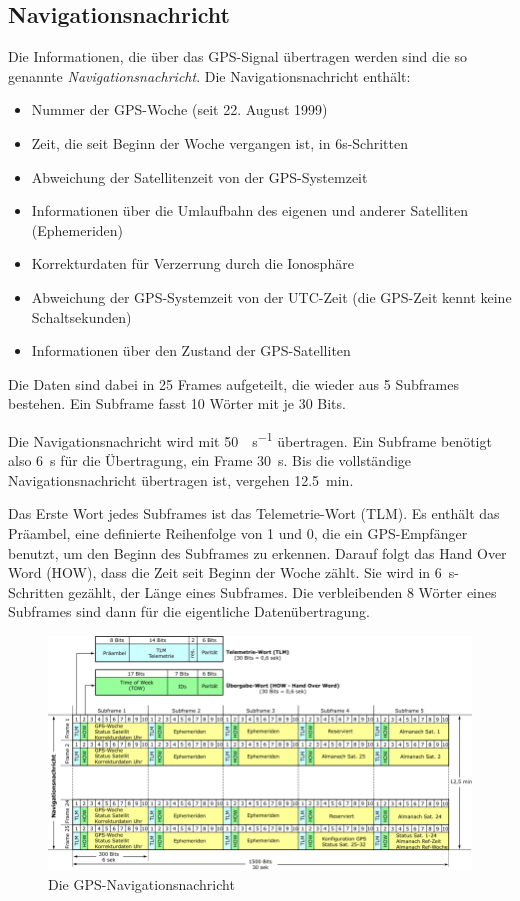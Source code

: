 \documentclass[12pt,a4paper]{scrartcl}
\begin{document}
\subsection{Navigationsnachricht}
Die Informationen, die über das GPS-Signal übertragen werden sind die so genannte \emph{Navigationsnachricht}. Die Navigationsnachricht enthält:
\begin{itemize}
\item Nummer der GPS-Woche (seit 22. August 1999)
\item Zeit, die seit Beginn der Woche vergangen ist, in 6s-Schritten
\item Abweichung der Satellitenzeit von der GPS-Systemzeit
\item Informationen über die Umlaufbahn des eigenen und anderer Satelliten (Ephemeriden)
\item Korrekturdaten für Verzerrung durch die Ionosphäre
\item Abweichung der GPS-Systemzeit von der UTC-Zeit (die GPS-Zeit kennt keine Schaltsekunden)
\item Informationen über den Zustand der GPS-Satelliten
\end{itemize}
\cite{infotip_gps}

Die Daten sind dabei in 25 Frames aufgeteilt, die wieder aus 5 Subframes bestehen. Ein Subframe fasst 10 Wörter mit je 30 Bits.

Die Navigationsnachricht wird mit \SI{50}{\bit\per\second} übertragen.
Ein Subframe benötigt also \SI{6}{\second} für die Übertragung, ein Frame \SI{30}{\second}. Bis die vollständige Navigationsnachricht übertragen ist, vergehen \SI{12.5}{\minute}.

Das Erste Wort jedes Subframes ist das Telemetrie-Wort (TLM). Es enthält das Präambel, eine definierte Reihenfolge von 1 und 0, die ein GPS-Empfänger benutzt, um den Beginn des Subframes zu erkennen.  Darauf folgt das Hand Over Word (HOW), dass die Zeit seit Beginn der Woche zählt. Sie wird in \SI{6}{\second}-Schritten gezählt, der Länge eines Subframes. Die verbleibenden 8 Wörter eines Subframes sind dann für die eigentliche Datenübertragung.

\begin{figure}[H]
\centering
\includegraphics[width=\textwidth]{img/navigation_message.png}
\caption{Die GPS-Navigationsnachricht\cite{infotip_gps}}
\label{fig:nm}
\end{figure}
\end{document}
